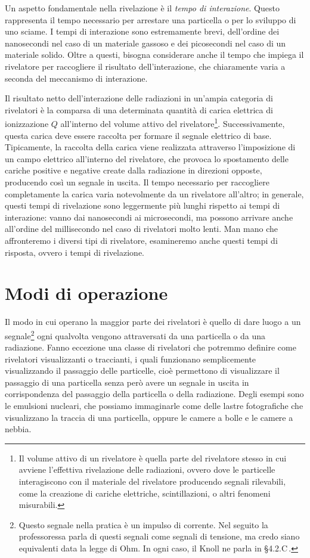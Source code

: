 Un aspetto fondamentale nella rivelazione è il \textit{tempo di interazione}. Questo rappresenta il tempo necessario per arrestare una particella o per lo sviluppo di uno sciame. I tempi di interazione sono estremamente brevi, dell'ordine dei nanosecondi nel caso di un materiale gassoso e dei picosecondi nel caso di un materiale solido. Oltre a questi, bisogna considerare anche il tempo che impiega il rivelatore per raccogliere il risultato dell'interazione, che chiaramente varia a seconda del meccanismo di interazione.

Il risultato netto dell'interazione delle radiazioni in un'ampia categoria di rivelatori è la comparsa di una determinata quantità di carica elettrica di ionizzazione $Q$ all'interno del volume attivo del rivelatore\footnote{Il volume attivo di un rivelatore è quella parte del rivelatore stesso in cui avviene l'effettiva rivelazione delle radiazioni, ovvero dove le particelle interagiscono con il materiale del rivelatore producendo segnali rilevabili, come la creazione di cariche elettriche, scintillazioni, o altri fenomeni misurabili.}. Successivamente, questa carica deve essere raccolta per formare il segnale elettrico di base. Tipicamente, la raccolta della carica viene realizzata attraverso l'imposizione di un campo elettrico all'interno del rivelatore, che provoca lo spostamento delle cariche positive e negative create dalla radiazione in direzioni opposte, producendo così un segnale in uscita. Il tempo necessario per raccogliere completamente la carica varia notevolmente da un rivelatore all'altro; in generale, questi tempi di rivelazione sono leggermente più lunghi rispetto ai tempi di interazione: vanno dai nanosecondi ai microsecondi, ma possono arrivare anche all'ordine del millisecondo nel caso di rivelatori molto lenti. Man mano che affronteremo i diversi tipi di rivelatore, esamineremo anche questi tempi di risposta, ovvero i tempi di rivelazione.

\section{Modi di operazione}

Il modo in cui operano la maggior parte dei rivelatori è quello di dare luogo a un segnale\footnote{Questo segnale nella pratica è un impulso di corrente. Nel seguito la professoressa parla di questi segnali come segnali di tensione, ma credo siano equivalenti data la legge di Ohm. In ogni caso, il Knoll ne parla in \S4.2.C\,.} ogni qualvolta vengono attraversati da una particella o da una radiazione. Fanno eccezione una classe di rivelatori che potremmo definire come rivelatori visualizzanti o traccianti, i quali funzionano semplicemente visualizzando il passaggio delle particelle, cioè permettono di visualizzare il passaggio di una particella senza però avere un segnale in uscita in corrispondenza del passaggio della particella o della radiazione. Degli esempi sono le emulsioni nucleari, che possiamo immaginarle come delle lastre fotografiche che visualizzano la traccia di una particella, oppure le camere a bolle e le camere a nebbia.

